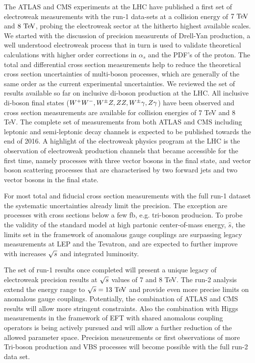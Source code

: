 The ATLAS and CMS experiments at the LHC have published a first set of electroweak measurements with the 
run-1 data-sets at a collision energy of $7\TeV$ and $8\TeV$,
probing the electroweak sector at the hitherto highest available scales.
We started with the discussion of precision measurents of Drell-Yan production, a well understood electroweak
process that in turn is used to validate theoretical calculations with higher order corrections in
$\alpha_s$ and the PDF's of the proton. The total and differential cross section measurements help to 
reduce the theoretical cross section uncertainties of multi-boson processes, which are generally of the same order as the current
experimental uncertainties.  
We reviewed the set of results available so far on inclusive di-boson production at the LHC. All inclusive di-boson final states
($W^+W^-,W^{\pm}Z,ZZ,W^{\pm}\gamma,Z\gamma$) have been observed and cross section measurements are available for collision energies of 7 TeV and 8 TeV. 
The complete set of measurements from both ATLAS and CMS including leptonic and semi-leptonic decay channels
is expected to be published towards the end of 2016.
A highlight of the electroweak physics program at the LHC is the observation of electroweak production channels 
that became accessible for the first time, namely processes with 
three vector bosons in the final state, and vector boson scattering processes that are 
characterised by two forward jets and two vector bosons in the final state.

For most total and fiducial cross section measurements with the full run-1 dataset the systematic uncertainties 
already limit the precision. The exception are processes with cross sections below a few fb, e.g. tri-boson producion. 
To probe the validity of the standard model at high partonic center-of-mass energy, $\hat{s}$, the limits
set in the framework of anomalous gauge couplings are surpassing legacy measurements at LEP and the Tevatron,
and are expected to further improve with increases $\sqrt{s}$ and integrated luminosity. 

The set of run-1 results once completed will present a unique legacy of electroweak precision results at 
$\sqrt{s}$ values of 7 and 8 TeV.
The run-2 analysis extend the energy range to $\rts=13\TeV$ 
and provide even more precise limits on anomalous gauge couplings. Potentially, 
the combination of ATLAS and CMS results will allow more stringent constraints. Also the combination
with Higgs measurements in the framework of EFT with shared anomalous coupling operators is being 
actively pursued and will allow a further reduction of the allowed parameter space. 
Precision measurements or first observations of more Tri-boson production and VBS processes will become possible with the full 
run-2 data set. 


 
